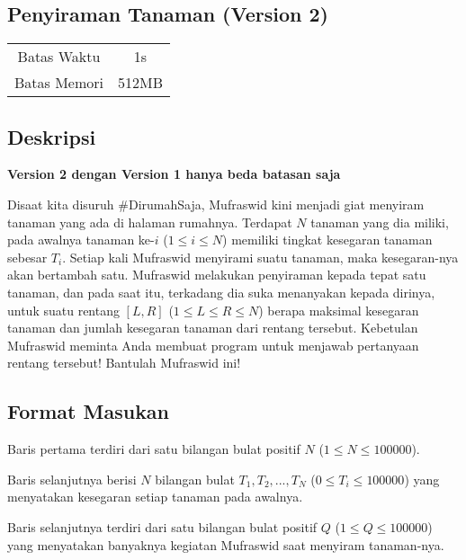 \documentclass{article}
\begin{document}
\begin{center}
    \section*{Penyiraman Tanaman (Version 2)} %

    \begin{tabular}{ | c c | }
        \hline
        Batas Waktu  & 1s \\    %
        Batas Memori & 512MB \\  %
        \hline
    \end{tabular}
\end{center}

\subsection*{Deskripsi}
\vspace{-\baselineskip}
\begin{center}
\textbf{Version 2 dengan Version 1 hanya beda batasan saja}
\end{center}
\vspace{-\baselineskip}
Disaat kita disuruh \#DirumahSaja, Mufraswid kini menjadi giat menyiram tanaman yang ada di halaman rumahnya. Terdapat $N$ tanaman yang dia miliki, pada awalnya tanaman ke-$i$ ($1 \leq i \leq N$) memiliki tingkat kesegaran tanaman sebesar $T_i$. Setiap kali Mufraswid menyirami suatu tanaman, maka kesegaran-nya akan bertambah satu. Mufraswid melakukan penyiraman kepada tepat satu tanaman, dan pada saat itu, terkadang dia suka menanyakan kepada dirinya, untuk suatu rentang $\left[L, R \right]$ ($1 \leq L \leq R \leq N$) berapa maksimal kesegaran tanaman dan jumlah kesegaran tanaman dari rentang tersebut. Kebetulan Mufraswid meminta Anda membuat program untuk menjawab pertanyaan rentang tersebut! Bantulah Mufraswid ini!

\subsection*{Format Masukan}

Baris pertama terdiri dari satu bilangan bulat positif $N$ ($1 \leq N \leq 100000$).

Baris selanjutnya berisi $N$ bilangan bulat $T_1, T_2, ..., T_N$ ($0 \leq T_i \leq 100000$) yang menyatakan kesegaran setiap tanaman pada awalnya.

Baris selanjutnya terdiri dari satu bilangan bulat positif $Q$ ($1 \leq Q \leq 100000$) yang menyatakan banyaknya kegiatan Mufraswid saat menyiram tanaman-nya.
\end{document}
